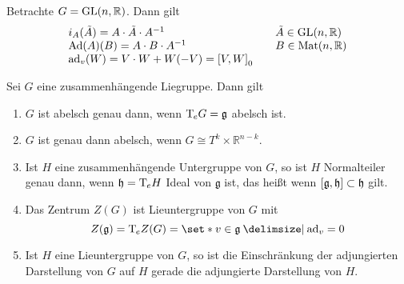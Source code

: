 \begin{beispiel*}[{name=[Adjungierte Darstellung der allgemeinen linearen Gruppe]}]
	Betrachte $G= \GL(n,\mathbb{R})$.
	Dann gilt
	\[
		\begin{array}{ll}
			i_A(\tilde{A}) = A \cdot \tilde{A} \cdot A^{-1} \quad & \tilde{A} \in \GL(n,\mathbb{R}) \\
			\Ad(A)(B) = A \cdot B \cdot A^{-1} & B \in \Mat(n,\mathbb{R}) \\
			\ad_v(W) = V \cdot W + W (-V) = \benbrace*{V,W}_0 \quad 
		\end{array}
	\]
\end{beispiel*}

\begin{lemma}[label=lem:154]
	Sei $G$ eine zusammenhängende Liegruppe. Dann gilt
	\begin{enumerate}[1)]
		\item $G$ ist abelsch genau dann, wenn $\Tmap_e G = \mathfrak{g}$ abelsch ist.
		\item $G$ ist genau dann abelsch, wenn $G \cong T^k \times \mathbb{R}^{n-k}$.
		\item Ist $H$ eine zusammenhängende Untergruppe von $G$, so ist $H$ Normalteiler genau dann, wenn $\mathfrak{h} = \Tmap_e H$ Ideal von $\mathfrak{g}$ ist, das heißt wenn $\benbrace*{\mathfrak{g},\mathfrak{h}} \subset \mathfrak{h}$ gilt.
		\item Das Zentrum $Z(G)$ ist Lieuntergruppe von $G$ mit 
		\[
			Z(\mathfrak{g}) = \Tmap_e Z(G) = \set*{v \in \mathfrak{g} \given \ad_v =0}
		\]
		\item Ist $H$ eine Lieuntergruppe von $G$, so ist die Einschränkung der adjungierten Darstellung von $G$ auf $H$ gerade die adjungierte Darstellung von $H$.
	\end{enumerate}
\end{lemma}
